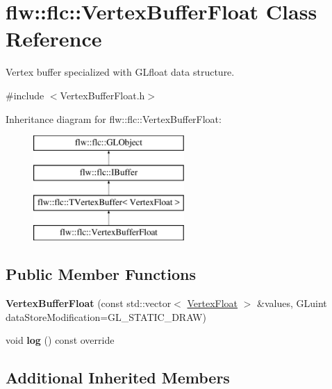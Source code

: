 \hypertarget{classflw_1_1flc_1_1VertexBufferFloat}{}\section{flw\+:\+:flc\+:\+:Vertex\+Buffer\+Float Class Reference}
\label{classflw_1_1flc_1_1VertexBufferFloat}


Vertex buffer specialized with G\+Lfloat data structure.  




{\ttfamily \#include $<$Vertex\+Buffer\+Float.\+h$>$}

Inheritance diagram for flw\+:\+:flc\+:\+:Vertex\+Buffer\+Float\+:\begin{figure}[H]
\begin{center}
\leavevmode
\includegraphics[height=4.000000cm]{classflw_1_1flc_1_1VertexBufferFloat}
\end{center}
\end{figure}
\subsection*{Public Member Functions}
\begin{DoxyCompactItemize}
\item 
{\bfseries Vertex\+Buffer\+Float} (const std\+::vector$<$ \hyperlink{structflw_1_1flc_1_1VertexFloat}{Vertex\+Float} $>$ \&values, G\+Luint data\+Store\+Modification=G\+L\+\_\+\+S\+T\+A\+T\+I\+C\+\_\+\+D\+R\+AW)\hypertarget{classflw_1_1flc_1_1VertexBufferFloat_aa2da66a0cd420f50099102443f90174e}{}\label{classflw_1_1flc_1_1VertexBufferFloat_aa2da66a0cd420f50099102443f90174e}

\item 
void {\bfseries log} () const override\hypertarget{classflw_1_1flc_1_1VertexBufferFloat_a1559fe63f4422431e9911b7b5d746552}{}\label{classflw_1_1flc_1_1VertexBufferFloat_a1559fe63f4422431e9911b7b5d746552}

\end{DoxyCompactItemize}
\subsection*{Additional Inherited Members}


